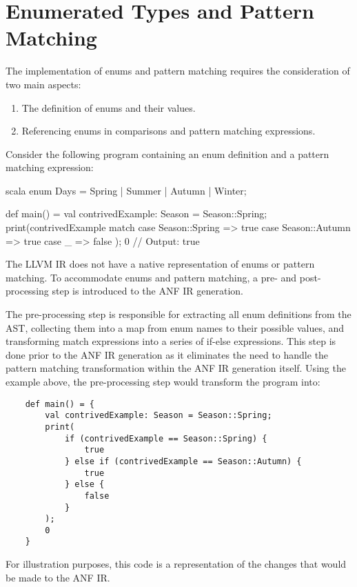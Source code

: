 \section{Enumerated Types and Pattern Matching}

The implementation of enums and pattern matching requires the consideration of two main aspects:
\begin{enumerate}
    \singlespacing
    \item The definition of enums and their values.
    \item Referencing enums in comparisons and pattern matching expressions.
\end{enumerate}
Consider the following program containing an enum definition and a pattern matching expression:

\begin{code}{scala}
    enum Days = Spring | Summer | Autumn | Winter;

    def main() = {
        val contrivedExample: Season = Season::Spring;
        print(contrivedExample match {
            case Season::Spring => true
            case Season::Autumn => true
            case _ => false
        });
        0
    }
    // Output: true
\end{code}

The LLVM IR does not have a native representation of enums or pattern matching. To accommodate enums
and pattern matching, a pre- and post-processing step is introduced to the ANF IR generation.

The pre-processing step is responsible for extracting all enum definitions from the AST, collecting
them into a map from enum names to their possible values, and transforming match expressions into a
series of if-else expressions. This step is done prior to the ANF IR generation as it eliminates the
need to handle the pattern matching transformation within the ANF IR generation itself. Using the
example above, the pre-processing step would transform the program into:

\begin{tcolorbox}
    \begin{verbatim}
    def main() = {
        val contrivedExample: Season = Season::Spring;
        print(
            if (contrivedExample == Season::Spring) {
                true
            } else if (contrivedExample == Season::Autumn) {
                true
            } else {
                false
            }
        );
        0
    }
    \end{verbatim}
    \tcblower
    \footnotesize
    For illustration purposes, this code is a representation of the changes that would be made to
    the ANF IR.
\end{tcolorbox}


